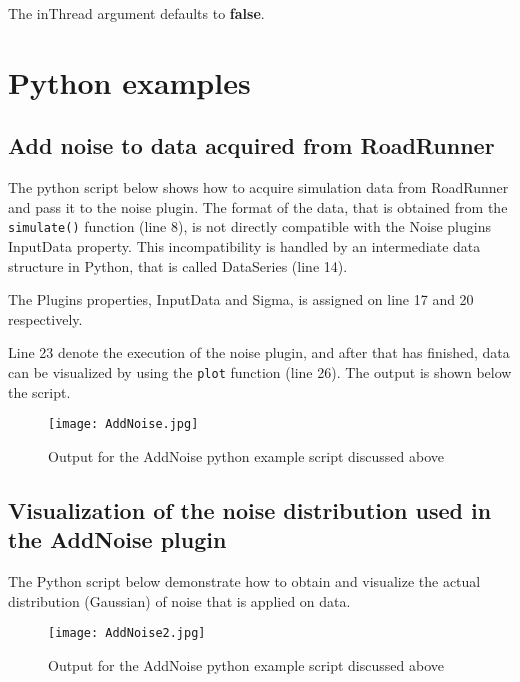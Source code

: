 The inThread argument defaults to \textbf{false}.

\section{Python examples}

\subsection{Add noise to data acquired from RoadRunner}
The python script below shows how to acquire simulation data from RoadRunner and pass it to the noise plugin. The format of the data, that is obtained from the \verb|simulate()| function (line 8), is not directly compatible with the Noise plugins InputData property. This incompatibility is handled by an intermediate data structure in Python, that is called DataSeries (line 14). 

The Plugins properties, InputData and Sigma, is assigned on line 17 and 20 respectively. 

Line 23 denote the execution of the noise plugin, and after that has finished, data can be visualized by using the \verb|plot| function (line 26). The output is shown below the script. 

\begin{singlespace}

\end{singlespace}

\begin{figure}[H]
\centering
\texttt{[image: AddNoise.jpg]}
\caption{Output for the AddNoise python example script discussed above}
\label{fig:addNoiseFig1}
\end{figure}

\subsection{Visualization of the noise distribution used in the AddNoise plugin}
The Python script below demonstrate how to obtain and visualize the actual distribution (Gaussian) of noise that is applied on data.

\begin{singlespace}

\end{singlespace}

\begin{figure}[H]
\centering
\texttt{[image: AddNoise2.jpg]}
\caption{Output for the AddNoise python example script discussed above}
\label{fig:addNoiseFig2}
\end{figure}

 






